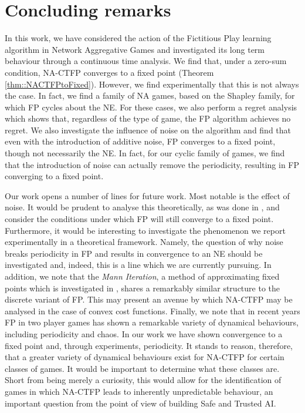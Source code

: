\documentclass{article}
\theoremstyle{definition}
\begin{document}
\section{Concluding remarks}
	In this work, we have considered the action of the Fictitious Play learning algorithm in Network Aggregative Games and investigated its long term behaviour through a continuous time analysis. We find that, under a zero-sum condition, NA-CTFP converges to a fixed point (Theorem \ref{thm::NACTFPtoFixed}). However, we find experimentally that this is not always the case. In fact, we find a family of NA games, based on the Shapley family, for which FP cycles about the NE. For these cases, we also perform a regret analysis which shows that, regardless of the type of game, the FP algorithm achieves no regret. 
%	
	We also investigate the influence of noise on the algorithm and find that even with the introduction of additive noise, FP converges to a fixed point, though not necessarily the NE. In fact, for our cyclic family of games, we find that the introduction of noise can actually remove the periodicity, resulting in FP converging to a fixed point.
	
	Our work opens a number of lines for future work. Most notable is the effect of noise. It would be prudent to analyse this theoretically, as was done in \cite{Perrin2020}, and consider the conditions under which FP will still converge to a fixed point. Furthermore, it would be interesting to investigate the phenomenon we report experimentally in a theoretical framework. Namely, the question of why noise breaks periodicity in FP and results in convergence to an NE should be investigated and, indeed, this is a line which we are currently pursuing.
%	
	In addition, we note that the \emph{Mann Iteration}, a method of approximating fixed points which is investigated in \cite{Parise2020}, shares a remarkably similar structure to the discrete variant of FP. This may present an avenue by which NA-CTFP may be analysed in the case of convex cost functions. 
%	
	Finally, we note that in recent years FP in two player games has shown a remarkable variety of dynamical behaviours, including periodicity and chaos. In our work we have shown convergence to a fixed point and, through experiments, periodicity. It stands to reason, therefore, that a greater variety of dynamical behaviours exist for NA-CTFP for certain classes of games. It would be important to determine what these classes are. Short from being merely a curiosity, this would allow for the identification of games in which NA-CTFP leads to inherently unpredictable behaviour, an important question from the point of view of building Safe and Trusted AI.
\end{document}
